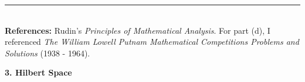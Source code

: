 \documentclass[11pt]{article}
\begin{document}
\hrule
$\,$\\
\noindent \textbf{References:} Rudin's \textit{Principles of Mathematical Analysis}. For part (d), I referenced \textit{The William Lowell Putnam Mathematical Competitions Problems and Solutions} (1938 - 1964). 



























\newpage









\noindent \textbf{3. Hilbert Space}
\end{document}
